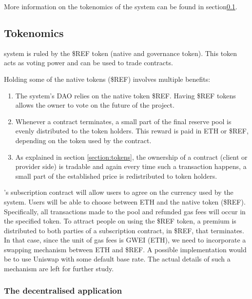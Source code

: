 More information on the tokenomics of the system can be found in section\ref{section:tokenomics}. 

\subsection{Tokenomics} \label{section:tokenomics}

{\projectName} system is ruled by the \$REF token (native and governance token). This token acts as voting power and can be used to trade contracts. 

Holding some of the native tokens (\$REF) involves multiple benefits: 
\begin{enumerate}
    \item The system's DAO relies on the native token \$REF. Having \$REF tokens allows the owner to vote on the future of the project.
    \item Whenever a contract terminates, a small part of the final reserve pool is evenly distributed to the token holders. This reward is paid in ETH or \$REF, depending on the token used by the contract. 
    \item As explained in section \ref{section:tokens}, the ownership of a contract (client or provider side) is tradable and again every time such a transaction happens, a small part of the established price is redistributed to token holders. 
\end{enumerate}

{\projectName}'s subscription contract will allow users to agree on the currency used by the system. Users will be able to choose between ETH and the {\projectName} native token (\$REF). Specifically, all transactions made to the pool and refunded gas fees will occur in the specified token. To attract people on using the \$REF token, a premium is distributed to both parties of a subscription contract, in \$REF, that terminates. In that case, since the unit of gas fees is GWEI (ETH), we need to incorporate a swapping mechanism between ETH and \$REF. A possible implementation would be to use Uniswap with some default base rate. The actual details of such a mechanism are left for further study.


\subsubsection{The {\projectName} decentralised application}

